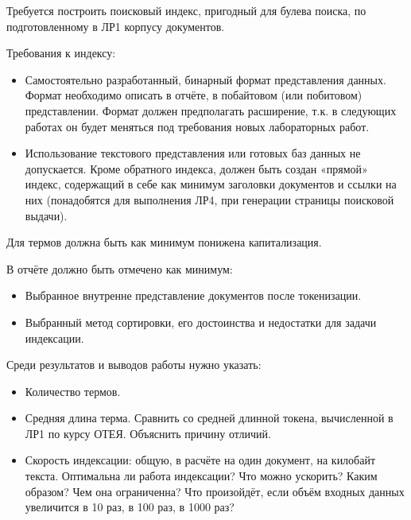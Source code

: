 
Требуется построить поисковый индекс, пригодный для булева поиска, по подготовленному в ЛР1
корпусу документов.

Требования к индексу:
\begin{itemize}
    \item Самостоятельно разработанный, бинарный формат представления данных. Формат необходимо описать в отчёте, в побайтовом (или побитовом) представлении. Формат должен предполагать расширение, т.к. в следующих работах он будет меняться под требования новых лабораторных работ.
    \item Использование текстового представления или готовых баз данных не допускается. Кроме обратного индекса, должен быть создан «прямой» индекс, содержащий в себе как минимум заголовки документов и ссылки на них (понадобятся для выполнения ЛР4, при генерации страницы поисковой выдачи).
\end{itemize}

Для термов должна быть как минимум понижена капитализация.

В отчёте должно быть отмечено как минимум:
\begin{itemize}
    \item Выбранное внутренне представление документов после токенизации.
    \item Выбранный метод сортировки, его достоинства и недостатки для задачи индексации.
\end{itemize}

Среди результатов и выводов работы нужно указать:
\begin{itemize}
    \item Количество термов.
    \item Средняя длина терма. Сравнить со средней длинной токена, вычисленной в ЛР1 по курсу ОТЕЯ. Объяснить причину отличий.
    \item Скорость индексации: общую, в расчёте на один документ, на килобайт текста. Оптимальна ли работа индексации? Что можно ускорить? Каким образом? Чем она ограниченна? Что произойдёт, если объём входных данных увеличится в 10 раз, в 100 раз, в 1000 раз?
\end{itemize}

\pagebreak
